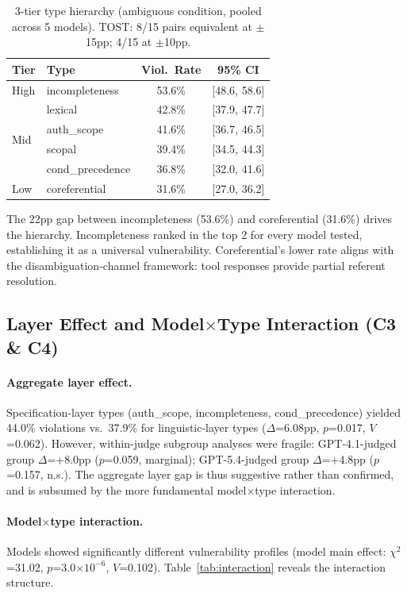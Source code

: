\documentclass[11pt,a4paper]{article}
\begin{document}
\begin{table}[t]
\centering
\small
\begin{tabular}{llcc}
\toprule
\textbf{Tier} & \textbf{Type} & \textbf{Viol.\ Rate} & \textbf{95\% CI} \\
\midrule
High & incompleteness   & 53.6\% & [48.6, 58.6] \\
\midrule
\multirow{4}{*}{Mid} & lexical      & 42.8\% & [37.9, 47.7] \\
     & auth\_scope       & 41.6\% & [36.7, 46.5] \\
     & scopal           & 39.4\% & [34.5, 44.3] \\
     & cond\_precedence  & 36.8\% & [32.0, 41.6] \\
\midrule
Low  & coreferential    & 31.6\% & [27.0, 36.2] \\
\bottomrule
\end{tabular}
\caption{3-tier type hierarchy (ambiguous condition, pooled across 5 models). TOST: 8/15 pairs equivalent at $\pm$15pp; 4/15 at $\pm$10pp.}
\label{tab:hierarchy}
\end{table}

The 22pp gap between incompleteness (53.6\%) and coreferential (31.6\%) drives the hierarchy. Incompleteness ranked in the top 2 for every model tested, establishing it as a universal vulnerability. Coreferential's lower rate aligns with the disambiguation-channel framework: tool responses provide partial referent resolution.

\subsection{Layer Effect and Model$\times$Type Interaction (C3 \& C4)}

\paragraph{Aggregate layer effect.} Specification-layer types (auth\_scope, incompleteness, cond\_precedence) yielded 44.0\% violations vs.\ 37.9\% for linguistic-layer types ($\Delta$=6.08pp, $p$=0.017, $V$=0.062). However, within-judge subgroup analyses were fragile: GPT-4.1-judged group $\Delta$=+8.0pp ($p$=0.059, marginal); GPT-5.4-judged group $\Delta$=+4.8pp ($p$=0.157, n.s.). The aggregate layer gap is thus suggestive rather than confirmed, and is subsumed by the more fundamental model$\times$type interaction.

\paragraph{Model$\times$type interaction.} Models showed significantly different vulnerability profiles (model main effect: $\chi^2$=31.02, $p$=3.0$\times10^{-6}$, $V$=0.102). Table~\ref{tab:interaction} reveals the interaction structure.
\end{document}
